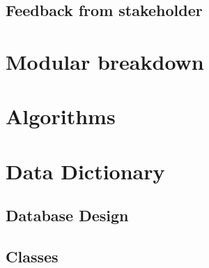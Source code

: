 \documentclass[11pt,a4paper]{report}
\begin{document}
\subsection{Feedback from stakeholder}

\section{Modular breakdown}


\pagebreak
\section{Algorithms}


\pagebreak
\section{Data Dictionary}

\subsection{Database Design}


\pagebreak
\subsection{Classes}






\end{document}
